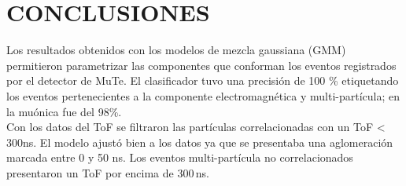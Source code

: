 
\chapter{CONCLUSIONES}


Los resultados obtenidos con los modelos de mezcla gaussiana (GMM) permitieron parametrizar las componentes que conforman los eventos registrados por el detector de MuTe. El clasificador tuvo una precisión de 100 \% etiquetando los eventos pertenecientes a la componente electromagnética y multi-partícula; en la muónica fue del 98\%.\\

Con los datos del ToF se filtraron las partículas correlacionadas con un ToF < 300ns. El modelo ajustó bien a los datos ya que se presentaba una aglomeración marcada entre 0 y 50 ns. Los eventos multi-partícula no correlacionados presentaron un ToF por encima de 300\,ns.\\

    


